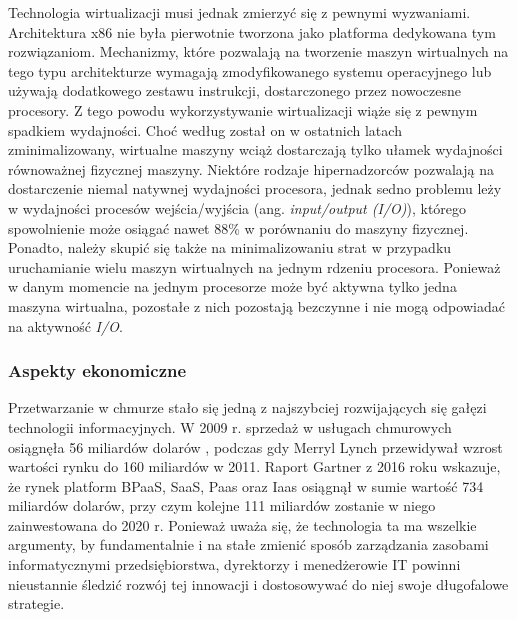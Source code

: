 \documentclass[12pt,a4paper,twoside]{article}
\begin{document}
Technologia wirtualizacji musi jednak zmierzyć się z pewnymi wyzwaniami. Architektura x86 nie była pierwotnie tworzona jako platforma dedykowana tym rozwiązaniom. Mechanizmy, które pozwalają na tworzenie maszyn wirtualnych na tego typu architekturze wymagają zmodyfikowanego systemu operacyjnego lub używają dodatkowego zestawu instrukcji, dostarczonego przez nowoczesne procesory. Z tego powodu wykorzystywanie wirtualizacji wiąże się z pewnym spadkiem wydajności. Choć według \citet{menon2005} został on w ostatnich latach zminimalizowany, wirtualne maszyny wciąż dostarczają tylko ułamek wydajności równoważnej fizycznej maszyny. Niektóre rodzaje hipernadzorców pozwalają na dostarczenie niemal natywnej wydajności procesora, jednak sedno problemu leży w wydajności procesów wejścia/wyjścia (ang. \textit{input/output (I/O)}), którego spowolnienie może osiągać nawet 88\% w porównaniu do maszyny fizycznej. Ponadto, należy skupić się także na minimalizowaniu strat w przypadku uruchamianie wielu maszyn wirtualnych na jednym rdzeniu procesora. Ponieważ w danym momencie na jednym procesorze może być aktywna tylko jedna maszyna wirtualna, pozostałe z nich pozostają bezczynne i nie mogą odpowiadać na aktywność \textit{I/O}.


\subsubsection{Aspekty ekonomiczne}

Przetwarzanie w chmurze stało się jedną z najszybciej rozwijających się gałęzi technologii informacyjnych. W 2009 r. sprzedaż w usługach chmurowych osiągnęła 56 miliardów dolarów \citep{smith2009}, podczas gdy Merryl Lynch przewidywał wzrost wartości rynku do 160 miliardów w 2011. Raport Gartner z 2016 roku \citep{anderson2016} wskazuje, że rynek platform BPaaS, SaaS, Paas oraz Iaas osiągnął w sumie wartość 734 miliardów dolarów, przy czym kolejne 111 miliardów zostanie w niego zainwestowana do 2020 r. Ponieważ uważa się, że technologia ta ma wszelkie argumenty, by fundamentalnie i na stałe zmienić sposób zarządzania zasobami informatycznymi przedsiębiorstwa, dyrektorzy i menedżerowie IT powinni nieustannie śledzić rozwój tej innowacji i dostosowywać do niej swoje długofalowe strategie.
\end{document}
